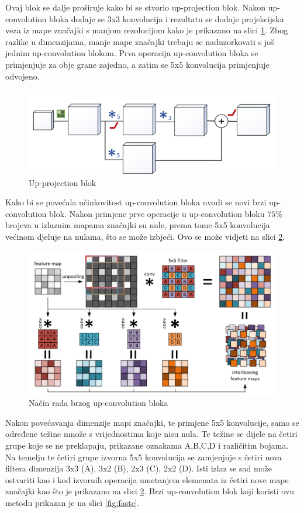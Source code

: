 \documentclass[times, utf8, zavrsni, numeric]{fer}
\begin{document}
Ovaj blok se dalje proširuje kako bi se stvorio up-projection blok. Nakon
up-convolution bloka dodaje se 3x3 konvolucija i rezultatu se dodaje
projekcijska veza iz mape značajki s manjom rezolucijom kako je prikazano na 
slici \ref{fig:upproj}. Zbog razlike u dimenzijama, manje mape značajki trebaju
se naduzorkovati s još jednim up-convolution blokom. Prva operacija 
up-convolution bloka se primjenjuje za obje grane zajedno, a zatim se 5x5
konvolucija primjenjuje odvojeno.
\begin{figure}[htb]
	\centering
	\includegraphics[scale=0.45]{up-proj.png}
	\caption{Up-projection blok}
	\label{fig:upproj}
\end{figure}

Kako bi se povećala učinkovitost up-convolution bloka uvodi se novi
brzi up-convolution blok. Nakon primjene prve operacije u up-convolution
bloku $75\%$ brojeva u izlaznim mapama značajki su nule, prema tome 5x5
konvolucija većinom djeluje na nulama, što se može izbjeći. Ovo se može
vidjeti na slici \ref{fig:fast}.

\begin{figure}[htb]
	\centering
	\includegraphics[scale=0.45]{fast.png}
	\caption{Način rada brzog up-convolution bloka}
	\label{fig:fast}
\end{figure}
Nakon povećavanja dimenzije mapi značajki, te primjene 5x5 konvolucije, samo
se određene težine množe s vrijednostima koje nisu nula. Te težine se dijele
na četiri grupe koje se ne preklapaju, prikazane oznakama A,B,C,D i različitim
bojama. Na temelju te četiri grupe izvorna 5x5 konvolucija se zamjenjuje s četiri nova
filtera dimenzija 3x3 (A), 3x2 (B), 2x3 (C), 2x2 (D). Isti izlaz se sad može 
ostvariti kao i kod izvornih operacija umetanjem elemenata iz četiri nove
mape značajki kao što je prikazano na slici \ref{fig:fast}. Brzi
up-convolution blok koji koristi ovu metodu prikazan je na slici \ref{fig:fastc}.
\end{document}
